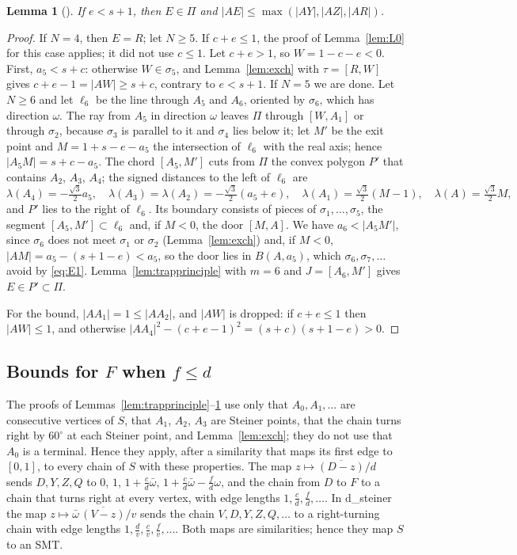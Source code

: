 \documentclass[11pt]{amsart}
\newtheorem{lemma}[theorem]{Lemma}
\theoremstyle{definition}
\theoremstyle{remark}
\numberwithin{equation}{section}
\begin{document}
\begin{lemma}[{\cite[Lemma~36]{KHSHGW}}]\label{lem:L8}
If $e<s+1$, then $E\in\Pi$ and $|AE|\le\max(|AY|,|AZ|,|AR|)$.
\end{lemma}

\begin{proof}
If $N=4$, then $E=R$; let $N\ge5$. If $c+e\le1$, the proof of Lemma~\ref{lem:L0} for this case applies; it did not use $c\le1$. Let $c+e>1$, so $W=1-c-e<0$. First, $a_5<s+c$: otherwise $W\in\sigma_5$, and Lemma~\ref{lem:exch} with $\tau=[R,W]$ gives $c+e-1=|AW|\ge s+c$, contrary to $e<s+1$. If $N=5$ we are done. Let $N\ge6$ and let $\ell_6$ be the line through $A_5$ and $A_6$, oriented by $\sigma_6$, which has direction $\omega$. The ray from $A_5$ in direction $\omega$ leaves $\Pi$ through $[W,A_1]$ or through $\sigma_2$, because $\sigma_3$ is parallel to it and $\sigma_4$ lies below it; let $M'$ be the exit point and $M=1+s-e-a_5$ the intersection of $\ell_6$ with the real axis; hence $|A_5M|=s+c-a_5$. The chord $[A_5,M']$ cuts from $\Pi$ the convex polygon $P'$ that contains $A_2$, $A_3$, $A_4$; the signed distances to the left of $\ell_6$ are
\[
\lambda(A_4)=-\tfrac{\sqrt3}2a_5,\quad\lambda(A_3)=\lambda(A_2)=-\tfrac{\sqrt3}2(a_5+e),\quad\lambda(A_1)=\tfrac{\sqrt3}2(M-1),\quad\lambda(A)=\tfrac{\sqrt3}2M,
\]
and $P'$ lies to the right of $\ell_6$. Its boundary consists of pieces of $\sigma_1,\dots,\sigma_5$, the segment $[A_5,M']\subset\ell_6$ and, if $M<0$, the door $[M,A]$. We have $a_6<|A_5M'|$, since $\sigma_6$ does not meet $\sigma_1$ or $\sigma_2$ (Lemma~\ref{lem:exch}) and, if $M<0$, $|AM|=a_5-(s+1-e)<a_5$, so the door lies in $B(A,a_5)$, which $\sigma_6,\sigma_7,\dots$ avoid by \eqref{eq:E1}. Lemma~\ref{lem:trapprinciple} with $m=6$ and $J=[A_6,M']$ gives $E\in P'\subset\Pi$.

For the bound, $|AA_1|=1\le|AA_2|$, and $|AW|$ is dropped: if $c+e\le1$ then $|AW|\le1$, and otherwise $|AA_4|^2-(c+e-1)^2=(s+c)(s+1-e)>0$.
\end{proof}

\subsection{\texorpdfstring{Bounds for $F$ when $f\le d$}{Bounds for F when f <= d}}
The proofs of Lemmas~\ref{lem:trapprinciple}--\ref{lem:L8} use only that $A_0,A_1,\dots$ are consecutive vertices of $S$, that $A_1$, $A_2$, $A_3$ are Steiner points, that the chain turns right by $60^\circ$ at each Steiner point, and Lemma~\ref{lem:exch}; they do not use that $A_0$ is a terminal. Hence they apply, after a similarity that maps its first edge to $[0,1]$, to every chain of $S$ with these properties. The map $z\mapsto\overline{(D-z)}/d$ sends $D,Y,Z,Q$ to $0$, $1$, $1+\frac cd\bar\omega$, $1+\frac cd\bar\omega-\frac fd\omega$, and the chain from $D$ to $F$ to a chain that turns right at every vertex, with edge lengths $1,\frac cd,\frac fd,\dots$. In d\_steiner the map $z\mapsto\bar\omega\,\overline{(V-z)}/v$ sends the chain $V,D,Y,Z,Q,\dots$ to a right-turning chain with edge lengths $1,\frac dv,\frac cv,\frac fv,\dots$. Both maps are similarities; hence they map $S$ to an SMT.
\end{document}
